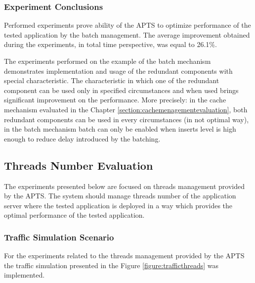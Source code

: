 \documentclass[12pt,a4paper]{article}
\begin{document}
\subsubsection{Experiment Conclusions} 

Performed experiments prove ability of the APTS to optimize performance of the tested application by the batch management. The average improvement obtained during the experiments, in total time perspective, was equal to 26.1\%. 

The experiments performed on the example of the batch mechanism demonstrates implementation and usage of the redundant components with special characteristic. The characteristic in which one of the redundant component can be used only in specified circumstances and when used brings significant improvement on the performance. More precisely: in the cache mechanism evaluated in the Chapter \ref{section:cachemenagementevaluation}, both redundant components can be used in every circumstances (in not optimal way), in the batch mechanism batch can only be enabled when inserts level is high enough to reduce delay introduced by the batching.  


\subsection{Threads Number Evaluation}

The experiments presented below are focused on threads management provided by the APTS. The system should manage threads number of the application server where the tested application is deployed in a way which provides the optimal performance of the tested application. 

\subsubsection{Traffic Simulation Scenario}

For the experiments related to the threads management provided by the APTS the traffic simulation presented in the Figure \ref{figure:trafficthreads} was implemented. 
\end{document}
